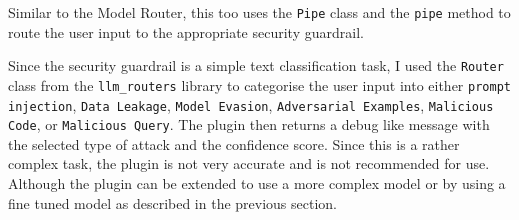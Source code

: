 Similar to the Model Router, this too uses the \texttt{Pipe} class and the \texttt{pipe} method to route the user input to the appropriate security guardrail.

Since the security guardrail is a simple text classification task, I used the \texttt{Router} class from the \texttt{llm\_routers} library to categorise the user input into either \texttt{prompt injection}, \texttt{Data Leakage}, \texttt{Model Evasion}, \texttt{Adversarial Examples}, \texttt{Malicious Code}, or \texttt{Malicious Query}. The plugin then returns a debug like message with the selected type of attack and the confidence score. Since this is a rather complex task, the plugin is not very accurate and is not recommended for use. Although the plugin can be extended to use a more complex model or by using a fine tuned model as described in the previous section.
